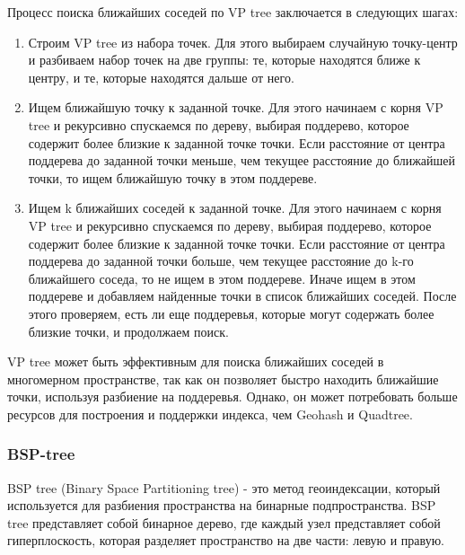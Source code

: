 Процесс поиска ближайших соседей по VP tree заключается в следующих шагах:

\begin{enumerate}
    \item Строим VP tree из набора точек. Для этого выбираем случайную точку-центр и разбиваем набор точек на две группы: те, которые находятся ближе к центру, и те, которые находятся дальше от него.
    \item Ищем ближайшую точку к заданной точке. Для этого начинаем с корня VP tree и рекурсивно спускаемся по дереву, выбирая поддерево, которое содержит более близкие к заданной точке точки. Если расстояние от центра поддерева до заданной точки меньше, чем текущее расстояние до ближайшей точки, то ищем ближайшую точку в этом поддереве.
    \item Ищем k ближайших соседей к заданной точке. Для этого начинаем с корня VP tree и рекурсивно спускаемся по дереву, выбирая поддерево, которое содержит более близкие к заданной точке точки. Если расстояние от центра поддерева до заданной точки больше, чем текущее расстояние до k-го ближайшего соседа, то не ищем в этом поддереве. Иначе ищем в этом поддереве и добавляем найденные точки в список ближайших соседей. После этого проверяем, есть ли еще поддеревья, которые могут содержать более близкие точки, и продолжаем поиск.
\end{enumerate}

VP tree может быть эффективным для поиска ближайших соседей в многомерном пространстве, так как он позволяет быстро находить ближайшие точки, используя разбиение на поддеревья. Однако, он может потребовать больше ресурсов для построения и поддержки индекса, чем Geohash и Quadtree.

\subsubsection{BSP-tree}
BSP tree (Binary Space Partitioning tree) - это метод геоиндексации, который используется для разбиения пространства на бинарные подпространства. BSP tree представляет собой бинарное дерево, где каждый узел представляет собой гиперплоскость, которая разделяет пространство на две части: левую и правую.

